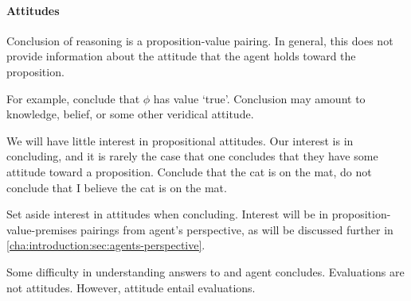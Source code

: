 \paragraph{Attitudes}

\begin{note}
  Conclusion of reasoning is a proposition-value pairing.
  In general, this does not provide information about the attitude that the agent holds toward the proposition.

  For example, conclude that \(\phi\) has value `true'.
  Conclusion may amount to knowledge, belief, or some other veridical attitude.

  We will have little interest in propositional attitudes.
  Our interest is in concluding, and it is rarely the case that one concludes that they have some attitude toward a proposition.
  Conclude that the cat is on the mat, do not conclude that I believe the cat is on the mat.

  Set aside interest in attitudes when concluding.
  Interest will be in proposition-value-premises pairings from agent's perspective, as will be discussed further in \autoref{cha:introduction:sec:agents-perspective}.
\end{note}

\begin{note}
  Some difficulty in understanding answers to \qWhy{} and agent concludes.
  Evaluations are not attitudes.
  However, attitude entail evaluations.
\end{note}


